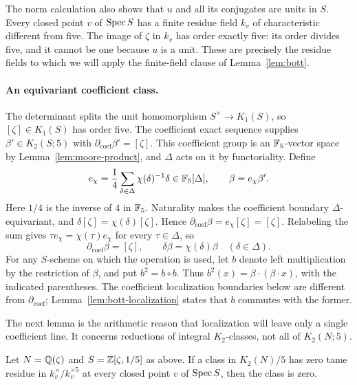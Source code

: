 The norm calculation also shows that $u$ and all its conjugates are
units in $S$.  Every closed point $v$ of $\operatorname{Spec} S$ has a finite
residue field $k_v$ of characteristic different from five.  The image of
$\zeta$ in $k_v$ has order exactly five: its order divides five, and it
cannot be one because $u$ is a unit.  These are precisely the residue
fields to which we will apply the finite-field clause of
Lemma~\ref{lem:bott}.

\paragraph{An equivariant coefficient class.}
The determinant splits the unit homomorphism
$S^\times\to K_1(S)$, so $[\zeta]\in K_1(S)$ has order
five.  The coefficient exact sequence supplies
$\beta'\in K_2(S;5)$ with
$\partial_{\mathrm{coef}}\beta'=[\zeta]$.  This coefficient group is an
$\mathbb F_5$-vector space by Lemma~\ref{lem:moore-product}, and $\Delta$ acts
on it by functoriality.  Define
\[
 e_\chi=\frac14\sum_{\delta\in\Delta}\chi(\delta)^{-1}\delta
       \in\mathbb F_5[\Delta],\qquad \beta=e_\chi\beta'.
\]
Here $1/4$ is the inverse of $4$ in $\mathbb F_5$.  Naturality makes the
coefficient boundary $\Delta$-equivariant, and
$\delta[\zeta]=\chi(\delta)[\zeta]$.  Hence
$\partial_{\mathrm{coef}}\beta=e_\chi[\zeta]=[\zeta]$.
Relabeling the sum gives $\tau e_\chi=\chi(\tau)e_\chi$ for every
$\tau\in\Delta$, so
\begin{equation}
 \label{eq:equivariant-bott}
 \partial_{\mathrm{coef}}\beta=[\zeta],\qquad
 \delta\beta=\chi(\delta)\beta\quad(\delta\in\Delta).
\end{equation}
For any $S$-scheme on which the operation is used, let $b$ denote
left multiplication by the restriction of $\beta$, and put
$b^2=b\circ b$.  Thus $b^2(x)=\beta\cdot(\beta\cdot x)$, with the
indicated parentheses.  The coefficient localization boundaries below
are different from $\partial_{\mathrm{coef}}$; Lemma~\ref{lem:bott-localization}
states that $b$ commutes with the former.

The next lemma is the arithmetic reason that localization will leave
only a single coefficient line.  It concerns reductions of integral
$K_2$-classes, not all of $K_2(N;5)$.

\begin{lemma}
\label{lem:cyclotomic-unramified}
Let $N=\mathbb Q(\zeta)$ and $S=\mathbb Z[\zeta,1/5]$ as above.  If a class in
$K_2(N)/5$ has zero tame residue in $k_v^\times/k_v^{\times5}$ at every
closed point $v$ of $\operatorname{Spec} S$, then the class is zero.
\end{lemma}

